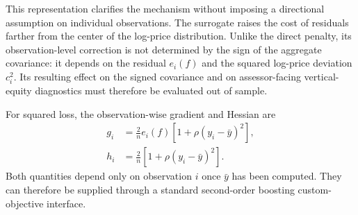 \documentclass[10pt]{article}
\theoremstyle{definition}
\newcommand{\1}{\mathbf{1}}
\begin{document}

{This representation clarifies the mechanism without imposing a directional assumption on individual observations. The surrogate raises the cost of residuals farther from the center of the log-price distribution. Unlike the direct penalty, its observation-level correction is not determined by the sign of the aggregate covariance: it depends on the residual $e_i(f)$ and the squared log-price deviation $c_i^2$. Its resulting effect on the signed covariance and on assessor-facing vertical-equity diagnostics must therefore be evaluated out of sample.}



For squared loss, the observation-wise gradient and Hessian are
\begin{align}
\label{eq:surrogate_derivatives}
g_i
&=
\frac{2}{n}e_i(f)
\left[1+\rho(y_i-\bar y)^2\right],
\\
h_i
&=
\frac{2}{n}
\left[1+\rho(y_i-\bar y)^2\right].
\end{align}
Both quantities depend only on observation $i$ once $\bar y$ has been computed. They can therefore be supplied through a standard second-order boosting custom-objective interface.
\end{document}
